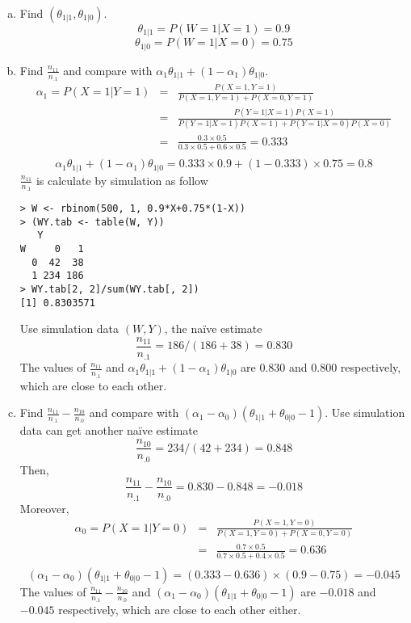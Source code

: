 \begin{enumerate}
\begin{enumerate}[(a)]
\item Find $(\theta_{1|1}, \theta_{1|0})$.
\[\theta_{1|1}=P(W=1|X=1)=0.9\]
\[\theta_{1|0}=P(W=1|X=0)=0.75\]
\item Find $\frac{n_{11}}{n_{.1}}$ and compare with $\alpha_1\theta_{1|1}+(1-\alpha_1)\theta_{1|0}$.
\[\begin{array}{rcl}
\alpha_1=P(X=1|Y=1)&=&\frac{P(X=1,Y=1)}{P(X=1,Y=1)+P(X=0,Y=1)}\\
&=& \frac{P(Y=1|X=1)P(X=1)}{P(Y=1|X=1)P(X=1)+P(Y=1|X=0)P(X=0)}\\
&=& \frac{0.3\times 0.5}{0.3\times 0.5+0.6\times 0.5} = 0.333\\
\end{array}\]
\[\alpha_1\theta_{1|1}+(1-\alpha_1)\theta_{1|0}=0.333\times 0.9+(1-0.333)\times 0.75= 0.8\]
$\frac{n_{11}}{n_{.1}}$ is calculate by simulation as follow
\begin{lstlisting}
> W <- rbinom(500, 1, 0.9*X+0.75*(1-X))
> (WY.tab <- table(W, Y))
   Y
W     0   1
  0  42  38
  1 234 186
> WY.tab[2, 2]/sum(WY.tab[, 2])
[1] 0.8303571
\end{lstlisting}
Use simulation data $(W, Y)$, the na\"ive estimate
\[\frac{n_{11}}{n_{.1}}=186/(186+38)= 0.830\]  
The values of $\frac{n_{11}}{n_{.1}}$ and $\alpha_1\theta_{1|1}+(1-\alpha_1)\theta_{1|0}$ are $0.830$ and $0.800$ respectively, which are close to each other.

\item Find $\frac{n_{11}}{n_{.1}}-\frac{n_{10}}{n_{.0}}$ and compare with $(\alpha_1-\alpha_0)(\theta_{1|1}+\theta_{0|0}-1)$.
Use simulation data can get another na\"ive estimate
\[\frac{n_{10}}{n_{.0}}=234/(42+234)= 0.848\] Then,
\[\frac{n_{11}}{n_{.1}}-\frac{n_{10}}{n_{.0}}= 0.830-0.848= -0.018\]
Moreover,
\[\begin{array}{rcl}
\alpha_0=P(X=1|Y=0)&=&\frac{P(X=1,Y=0)}{P(X=1,Y=0)+P(X=0,Y=0)}\\
&=& \frac{0.7\times 0.5}{0.7\times 0.5+0.4\times 0.5} = 0.636\\
\end{array}\]
\[(\alpha_1-\alpha_0)(\theta_{1|1}+\theta_{0|0}-1)=(0.333-0.636)\times(0.9-0.75)= -0.045\]
The values of $\frac{n_{11}}{n_{.1}}-\frac{n_{10}}{n_{.0}}$ and $(\alpha_1-\alpha_0)(\theta_{1|1}+\theta_{0|0}-1)$ are $-0.018$ and $-0.045$ respectively, which are close to each other either.


\end{enumerate}
\end{enumerate}
